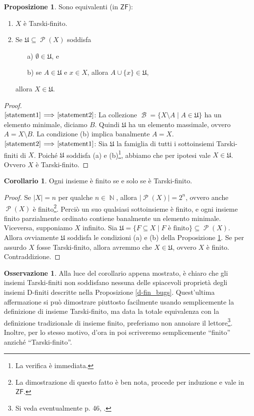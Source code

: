 \documentclass[12pt,a4paper]{report}
\theoremstyle{definition}
\newtheorem{oss}[teo]{Osservazione}  %
\newtheorem{prop}[teo]{Proposizione}  %
\newtheorem{corollario}[teo]{Corollario}  %
\theoremstyle{num.custom-title}
\DeclareMathOperator{\B}{\mathcal{B}}
\DeclareMathOperator{\U}{\mathcal{U}}
\DeclareMathOperator{\PP}{\mathcal{P}}
\DeclareMathOperator{\N}{\mathbb{N}}
\DeclareMathOperator{\sm}{\setminus}
\newcommand{\ZF}{\ensuremath{\mathsf{ZF}}\xspace}
\renewcommand{\U}{\mathfrak{U}}
\newcommand{\Implies}[2]{$\text{\ref{statement#1}}\!\implies\!\text{\ref{statement#2}}$}%
\newcommand{\punto}[1]{\item \label{statement#1}}
\newenvironment{equivalence}
    {\begin{enumerate}[label=(\arabic*),ref=(\arabic*)]
    }
    { 
	\end{enumerate}
    }
\begin{document}
\begin{prop}\label{caratt_t-fin} Sono equivalenti (in \ZF):
\begin{equivalence}
\punto{1} $X$ è Tarski-finito.
\punto{2} Se $\U \subseteq \PP(X)$ soddisfa
\begin{itemize}
\item[a)] $\emptyset \in \U$, e
\item[b)] se $A \in \U$ e $x \in X$, allora $A \cup \{x\} \in \U$,
\end{itemize}
allora $X \in \U$.
\end{equivalence}
\begin{proof}\ \\
\Implies{1}{2}: La collezione $\B = \{X \sm A \mid A \in \U\}$ ha un elemento minimale, diciamo $B$. Quindi $\U$ ha un elemento massimale, ovvero $A = X \sm B$. La condizione (b) implica banalmente $A=X$.\\
\Implies{2}{1}: Sia $\U$ la famiglia di tutti i sottoinsiemi Tarski-finiti di $X$. Poiché $\U$ soddisfa (a) e (b)\footnote{La verifica è immediata.}, abbiamo che per ipotesi vale $X \in \U$. Ovvero $X$ è Tarski-finito.
\end{proof}
\end{prop}

\begin{corollario}
Ogni insieme è finito se e solo se è Tarski-finito.
\begin{proof}
Se $|X|=n$ per qualche $n \in \N$, allora $|\PP(X)|=2^n$, ovvero anche $\PP(X)$ è finito\footnote{La dimostrazione di questo fatto è ben nota, procede per induzione e vale in \ZF.}. Perciò un suo qualsiasi sottoinsieme è finito, e ogni insieme finito parzialmente ordinato contiene banalmente un elemento minimale. Viceversa, supponiamo $X$ infinito. Sia $\U=\{F \subseteq X \mid F \text{ è finito}\} \subseteq \PP(X)$. Allora ovviamente $\U$ soddisfa le condizioni (a) e (b) della Proposizione \ref{caratt_t-fin}. Se per assurdo $X$ fosse Tarski-finito, allora avremmo che $X \in \U$, ovvero $X$ è finito. Contraddizione.
\end{proof}
\end{corollario}

\begin{oss}\label{oss_fin=t-fin}
Alla luce del corollario appena mostrato, è chiaro che gli insiemi Tarski-finiti non soddisfano nessuna delle spiacevoli proprietà degli insiemi D-finiti descritte nella Proposizione \ref{d-fin_bugs}. Quest'ultima affermazione si può dimostrare piuttosto facilmente usando semplicemente la definizione di insieme Tarski-finito, ma data la totale equivalenza con la definizione tradizionale di insieme finito, preferiamo non annoiare il lettore\footnote{Si veda eventualmente p. 46, \cite{Herrlich:Herrlich}.}. Inoltre, per lo stesso motivo, d'ora in poi scriveremo semplicemente ``finito'' anziché ``Tarski-finito''.
\end{oss}
\end{document}
